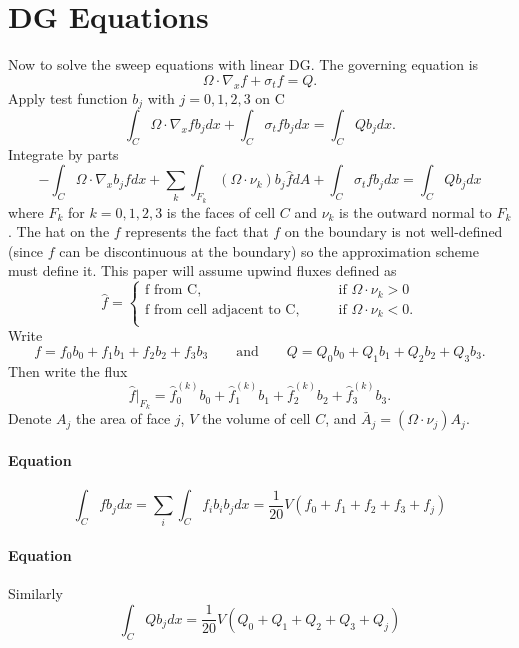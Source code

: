 \documentclass[12pt,letterpaper]{article}
\begin{document}
\section*{DG Equations}
Now to solve the sweep equations with linear DG.
The governing equation is
\begin{equation}
\Omega \cdot \nabla_x f + \sigma_t f = Q.
\end{equation}
Apply test function $b_j$ with $j = 0,1,2,3$ on C
\begin{equation}
\int_C \Omega \cdot \nabla_x f b_j dx + \int_C \sigma_t f b_j dx = \int_C Q b_j dx.
\end{equation}
Integrate by parts
\begin{equation}
-\int_C \Omega \cdot \nabla_x b_j f dx + \sum_k \int_{F_k} (\Omega \cdot \nu_k) b_j \hat{f} dA + \int_C \sigma_t f b_j dx = \int_C Q b_j dx
\end{equation}
where $F_k$ for $k = 0,1,2,3$ is the faces of cell $C$ and $\nu_k$ is the outward normal to $F_k$.
The hat on the $f$ represents the fact that $f$ on the boundary is not well-defined (since $f$ can be discontinuous at the boundary) so the approximation scheme must define it.
This paper will assume upwind fluxes defined as
\begin{equation}
\hat{f} = \begin{cases}
\textrm{f from C}, \qquad &\textrm{if } \Omega \cdot \nu_k > 0 \\
\textrm{f from cell adjacent to C}, \qquad &\textrm{if } \Omega \cdot \nu_k < 0. \\
\end{cases}
\end{equation}
Write $$f = f_0 b_0 + f_1 b_1 + f_2 b_2 + f_3 b_3 \qquad \textrm{and} \qquad Q = Q_0 b_0 + Q_1 b_1 + Q_2 b_2 + Q_3 b_3.$$
Then write the flux $$\hat{f}|_{F_k} = \hat{f}^{(k)}_0 b_0 + \hat{f}^{(k)}_1 b_1 + \hat{f}^{(k)}_2 b_2 + \hat{f}^{(k)}_3 b_3.$$
Denote $A_j$ the area of face $j$, $V$ the volume of cell $C$, and $\bar{A}_j = (\Omega \cdot \nu_j) A_j$.

\paragraph{Equation}
\begin{equation}
\int_C f b_j dx = \sum_i \int_C f_i b_i b_j dx
= \frac{1}{20} V (f_0 + f_1 + f_2 + f_3 + f_j)
\end{equation}

\paragraph{Equation} Similarly
\begin{equation}
\int_C Q b_j dx = \frac{1}{20} V (Q_0 + Q_1 + Q_2 + Q_3 + Q_j)
\end{equation}
\end{document}
